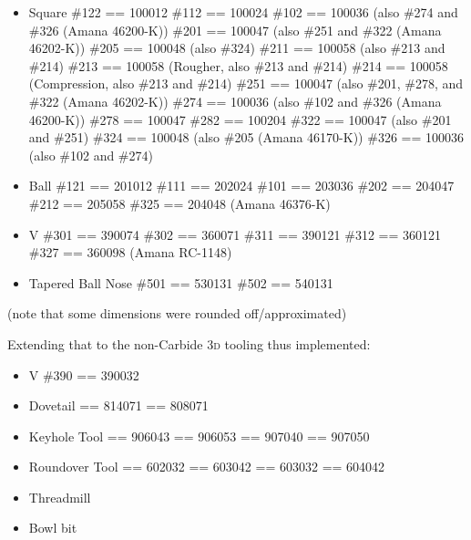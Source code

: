 \documentclass{ltxdoc}
\begin{document}
\begin{itemize}
\item Square
\subitem \#122 == 100012
\subitem \#112 == 100024
\subitem \#102 == 100036 (also \#274 and \#326 (Amana 46200-K))
\subitem \#201 == 100047 (also \#251 and \#322 (Amana 46202-K))
\subitem \#205 == 100048 (also \#324)
\subitem \#211 == 100058 (also \#213 and \#214)
\subitem \#213 == 100058 (Rougher, also \#213 and \#214)
\subitem \#214 == 100058 (Compression, also \#213 and \#214)
\subitem \#251 == 100047 (also \#201, \#278, and \#322 (Amana 46202-K))
\subitem \#274 == 100036 (also \#102 and \#326 (Amana 46200-K))
\subitem \#278 == 100047
\subitem \#282 == 100204
\subitem \#322 == 100047 (also \#201 and \#251)
\subitem \#324 == 100048 (also \#205 (Amana 46170-K))
\subitem \#326 == 100036 (also \#102 and \#274)

\item Ball
\subitem \#121 == 201012
\subitem \#111 == 202024
\subitem \#101 == 203036
\subitem \#202 == 204047
\subitem \#212 == 205058
\subitem \#325 == 204048 (Amana 46376-K)

\item V
\subitem \#301 == 390074
\subitem \#302 == 360071
\subitem \#311 == 390121
\subitem \#312 == 360121
\subitem \#327 == 360098 (Amana RC-1148)

\item Tapered Ball Nose
\subitem \#501 == 530131
\subitem \#502 == 540131
\end{itemize}

(note that some dimensions were rounded off/approximated)

Extending that to the non-Carbide \textsc{3d} tooling thus implemented:

\begin{itemize}
\item V
\subitem \#390 == 390032

\item Dovetail
 == 814071
 == 808071

\item Keyhole Tool
 == 906043
 == 906053
 == 907040
 == 907050

\item Roundover Tool
 == 602032
 == 603042
 == 603032
 == 604042

%
\item Threadmill

\item Bowl bit

\end{itemize}
\end{document}
